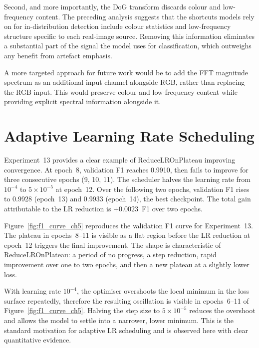 Second, and more importantly, the DoG transform discards colour and low-frequency content.
The preceding analysis suggests that the shortcuts models rely on for in-distribution
detection include colour statistics and low-frequency structure specific to each real-image
source. Removing this information eliminates a substantial part of the signal the model
uses for classification, which outweighs any benefit from artefact emphasis.

A more targeted approach for future work would be to add the FFT magnitude spectrum as
an additional input channel alongside RGB, rather than replacing the RGB input. This would
preserve colour and low-frequency content while providing explicit spectral information
alongside it.


\section{Adaptive Learning Rate Scheduling}
\label{sec:lr_scheduling}

Experiment~13 provides a clear example of ReduceLROnPlateau improving convergence. At
epoch~8, validation F1 reaches 0.9910, then fails to improve for three consecutive epochs
(9, 10, 11). The scheduler halves the learning rate from $10^{-4}$ to $5\times10^{-5}$
at epoch~12. Over the following two epochs, validation F1 rises to 0.9928 (epoch~13) and
0.9933 (epoch~14), the best checkpoint. The total gain attributable to the LR reduction
is $+0.0023$~F1 over two epochs.

Figure~\ref{fig:f1_curve_ch5} reproduces the validation F1 curve for Experiment~13.
The plateau in epochs~8--11 is visible as a flat region before the LR reduction at
epoch~12 triggers the final improvement. The shape is characteristic of
ReduceLROnPlateau: a period of no progress, a step reduction, rapid improvement over
one to two epochs, and then a new plateau at a slightly lower loss.

With learning rate $10^{-4}$, the optimiser overshoots the local minimum in the 
loss surface repeatedly, therefore the resulting oscillation is
visible in epochs~6--11 of Figure~\ref{fig:f1_curve_ch5}. Halving the step size to
$5\times10^{-5}$ reduces the overshoot and allows the model to settle into a narrower,
lower minimum. This is the standard motivation for adaptive LR scheduling and is observed
here with clear quantitative evidence.

